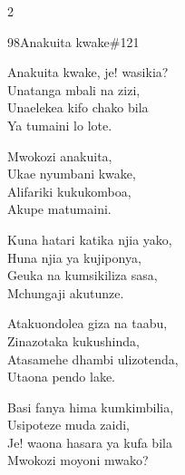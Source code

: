 \begin{multicols}{2}
\begin{hymn}{98}{Anakuita kwake}{\#121}
\begin{stanza}
Anakuita kwake, je! wasikia?\\
Unatanga mbali na zizi,\\
Unaelekea kifo chako bila\\
Ya tumaini lo lote.
\end{stanza}
\begin{chorus}
Mwokozi anakuita,\\
Ukae nyumbani kwake,\\
Alifariki kukukomboa,\\
Akupe matumaini.
\end{chorus}
\begin{stanza}
Kuna hatari katika njia yako,\\
Huna njia ya kujiponya,\\
Geuka na kumsikiliza sasa,\\
Mchungaji akutunze.
\end{stanza}
\begin{stanza}
Atakuondolea giza na taabu,\\
Zinazotaka kukushinda,\\
Atasamehe dhambi ulizotenda,\\
Utaona pendo lake.
\end{stanza}
\begin{stanza}
Basi fanya hima kumkimbilia,\\
Usipoteze muda zaidi,\\
Je! waona hasara ya kufa bila\\
Mwokozi moyoni mwako?
\end{stanza}
\end{hymn}


\end{multicols}
